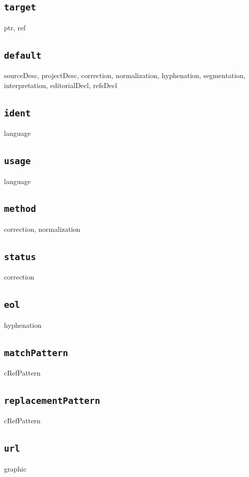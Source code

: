 \documentclass[12pt,a4paper]{article}
\begin{document}
\subsection{\texttt{target}} \label{att-sec:target}
ptr, ref

\subsection{\texttt{default}} \label{att-sec:default}
sourceDesc, projectDesc, correction, normalization, hyphenation, segmentation, interpretation, editorialDecl, refsDecl

\subsection{\texttt{ident}} \label{att-sec:ident}
language

\subsection{\texttt{usage}} \label{att-sec:usage}
language

\subsection{\texttt{method}} \label{att-sec:method}
correction, normalization

\subsection{\texttt{status}} \label{att-sec:status}
correction

\subsection{\texttt{eol}} \label{att-sec:eol}
hyphenation

\subsection{\texttt{matchPattern}} \label{att-sec:matchPattern}
cRefPattern

\subsection{\texttt{replacementPattern}} \label{att-sec:replacementPattern}
cRefPattern

\subsection{\texttt{url}} \label{att-sec:url}
graphic
\end{document}

